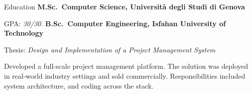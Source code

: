 \begin{rubric}{Education}
\entry*[2024 -- present]%
	\textbf{M.Sc.~Computer Science, Università degli Studi di Genova}\par
	GPA: \emph{30/30}.
% 
\entry*[2019 -- 2024]%
	\textbf{B.Sc.~Computer Engineering, Isfahan University of Technology}\par
	Thesis: \emph{Design and Implementation of a Project Management System}\par
	Developed a full-scale project management platform. The solution was deployed in real-world industry settings and sold commercially. Responsibilities included system architecture, and coding across the stack.
\end{rubric}
